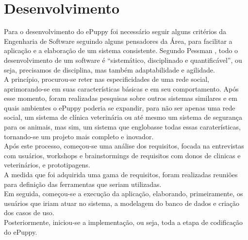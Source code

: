\chapter{Desenvolvimento}

Para o desenvolvimento do ePuppy foi necessário seguir alguns critérios da Engenharia de Software seguindo alguns pensadores da Área, para facilitar a aplicação e a elaboração de um sistema consistente. Segundo Pessman \cite{Pressman2006}, todo o desenvolvimento de um software é “sistemático, disciplinado e quantificável”, ou seja, precisamos de disciplina, mas também adaptabilidade e agilidade. 
\\
\indent
A princípio, procurou-se reter nas especificidades de uma rede social, aprimorando-se em suas características básicas e em seu comportamento. Após esse momento, foram realizadas pesquisas sobre outros sistemas similares e em quais ambientes o ePuppy poderia se expandir, para não ser apenas uma rede social, um sistema de clínica veterinária ou até mesmo um sistema de segurança para os animais, mas sim, um sistema que englobasse todas essas caraterísticas, tornando-se um projeto mais completo e inovador.
\\
\indent
Após este processo, começou-se uma análise dos requisitos, focada na entrevistas com usuários, workshops e brainstormings de requisitos com donos de clinicas e veterinários, e prototipagens. 
\\
\indent
A medida que foi adquirida uma gama de requisitos, foram realizadas reuniões para definição das ferramentas que seriam utilizadas.
\\
\indent
Em seguida, começou-se a execução da aplicação, elaborando, primeiramente, os usuários que iriam atuar no sistema, a modelagem do banco de dados e criação dos casos de uso. 
\\
\indent
Posteriormente, iniciou-se a implementação, ou seja, toda a etapa de codificação do ePuppy.


